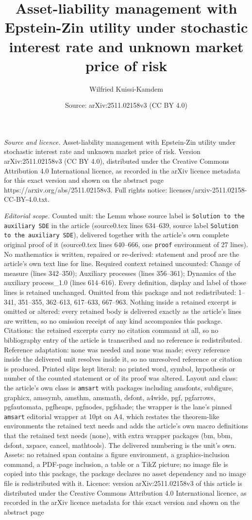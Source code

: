 \documentclass[10pt,a4paper]{amsart}
\title[Asset-liability management with Epstein-Zin utility under st]{Asset-liability management with Epstein-Zin utility under stochastic interest rate and unknown market price of risk}
\author{Wilfried Kuissi-Kamdem}
\date{Source: arXiv:2511.02158v3 (CC BY 4.0)}
\begin{document}
\maketitle

\noindent\emph{Source and licence.} Asset-liability management with Epstein-Zin utility under stochastic interest rate and unknown market price of risk. Version arXiv:2511.02158v3 (CC BY 4.0), distributed under the Creative Commons Attribution 4.0 International licence, as recorded in the arXiv licence metadata for this exact version and shown on the abstract page https://arxiv.org/abs/2511.02158v3. Full rights notice: licenses/arxiv-2511.02158-CC-BY-4.0.txt.\par\smallskip

\noindent\textit{Editorial scope.} Counted unit: the Lemm whose source label is \texttt{Solution to the auxiliary SDE} in the article (source0.tex lines 634--639, source label \texttt{Solution to the auxiliary SDE}), delivered together with the article's own complete original proof of it (source0.tex lines 640--666, one \texttt{proof} environment of 27 lines). No mathematics is written, repaired or re-derived: statement and proof are the article's own text line for line. Required context retained uncounted: Change of measure (lines 342--350); Auxiliary processes (lines 356--361); Dynamics of the auxiliary process\_1.0 (lines 614--616). Every definition, display and label of those lines is retained unchanged. Omitted from this package and not redistributed: 1--341, 351--355, 362--613, 617--633, 667--963. Nothing inside a retained excerpt is omitted or altered: every retained body is delivered exactly as the article's lines are written, so no omission receipt of any kind accompanies this package. Citations: the retained excerpts carry no citation command at all, so no bibliography entry of the article is transcribed and no reference is redistributed. Reference adaptation: none was needed and none was made; every reference inside the delivered unit resolves inside it, so no unresolved reference or citation is produced. Printed slips kept literal: no printed word, symbol, hypothesis or number of the counted statement or of its proof was altered. Layout and class: the article's own class is \texttt{amsart} with packages including amsfonts, subfigure, graphicx, amssymb, amsthm, amsmath, dsfont, a4wide, pgf, pgfarrows, pgfautomata, pgfheaps, pgfnodes, pgfshade; the wrapper is the lane's pinned \texttt{amsart} editorial wrapper at 10pt on A4, which restates the theorem-like environments the retained text needs and adds the article's own macro definitions that the retained text needs (none), with extra wrapper packages (bm, bbm, dsfont, xspace, cancel, mathtools). The delivered numbering is the unit's own. Assets: no retained span contains a figure environment, a graphics-inclusion command, a PDF-page inclusion, a table or a TikZ picture; no image file is copied into this package, the package declares no asset dependency and no image file is redistributed with it. Licence: version arXiv:2511.02158v3 of this article is distributed under the Creative Commons Attribution 4.0 International licence, as recorded in the arXiv licence metadata for this exact version and shown on the abstract page 
\end{document}
